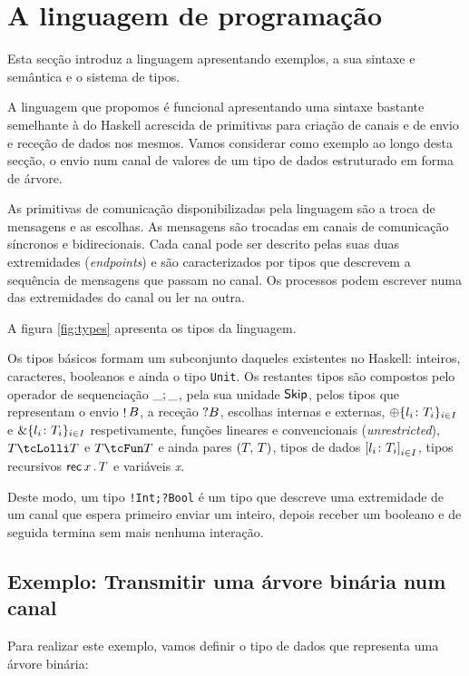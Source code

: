 \section{A linguagem de programação}
\lstset{language=CFST, style=eclipse}

Esta secção introduz a linguagem apresentando exemplos, a sua sintaxe e semântica e o sistema de tipos. 

A linguagem que propomos é funcional apresentando uma sintaxe bastante semelhante à do Haskell acrescida de primitivas para criação de canais e de envio e receção de dados nos mesmos. Vamos considerar como exemplo ao longo desta secção, o envio num canal de valores de um tipo de dados estruturado em forma de árvore.

As primitivas de comunicação disponibilizadas pela linguagem são a troca de mensagens e as escolhas. As mensagens são trocadas em canais de comunicação síncronos e bidirecionais. Cada canal pode ser descrito pelas suas duas extremidades (\textit{endpoints}) e são caracterizados por tipos que descrevem a sequência de mensagens que passam no canal.
Os processos podem escrever numa das extremidades do canal ou ler na outra.

A figura \ref{fig:types} apresenta os tipos da linguagem.



Os tipos básicos formam um subconjunto daqueles existentes no Haskell: inteiros, caracteres, booleanos e ainda o tipo \lstinline"Unit". Os restantes tipos são compostos pelo operador de sequenciação $\_;\_$, pela sua unidade $\mathsf{Skip}$, pelos tipos que representam o envio $\mathop! B$, a receção $?B$, escolhas internas e externas, $\oplus\{l_i\colon T_i\}_{i\in I}$ e $\&\{l_i\colon T_i\}_{i\in I}$ respetivamente, funções lineares e convencionais (\textit{unrestricted}), $\tLinFun{T}{T}$ e $\tUnFun{T}{T}$ e ainda pares $(T,\,T)$, tipos de dados ${[l_i\colon T_i]}_{i\in I}$, tipos recursivos $\mathsf{rec}\,x\,.\,T$ e variáveis \textit{x}.

Deste modo, um tipo \lstinline"!Int;?Bool" é um tipo que descreve uma extremidade de um canal que espera primeiro enviar um inteiro, depois receber um booleano e de seguida termina sem mais nenhuma interação.

\subsection{Exemplo: Transmitir uma árvore binária num canal}
\label{sec:example}
Para realizar este exemplo, vamos definir o tipo de dados que representa uma árvore binária:

